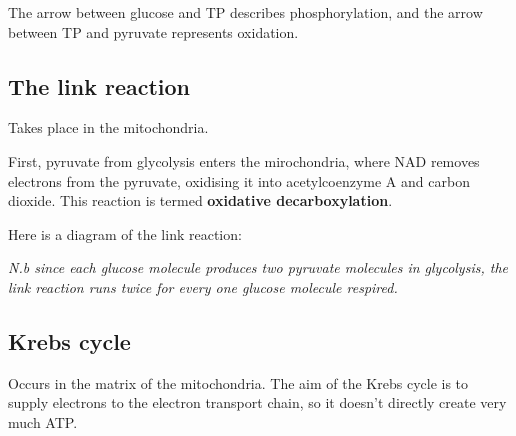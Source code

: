 \documentclass{article}
\begin{document}
The arrow between glucose and TP describes phosphorylation, and the arrow between TP and pyruvate represents oxidation.

\subsection*{The link reaction}
Takes place in the mitochondria.

First, pyruvate from glycolysis enters the mirochondria, where NAD removes electrons from the pyruvate, oxidising it into acetylcoenzyme A and carbon dioxide. This reaction is termed \textbf{oxidative decarboxylation}.

Here is a diagram of the link reaction:

\begin{center}
\end{center}

\textit{N.b since each glucose molecule produces two pyruvate molecules in glycolysis, the link reaction runs twice for every one glucose molecule respired.}

\subsection*{Krebs cycle}
Occurs in the matrix of the mitochondria. The aim of the Krebs cycle is to supply electrons to the electron transport chain, so it doesn't directly create very much ATP.
\end{document}
